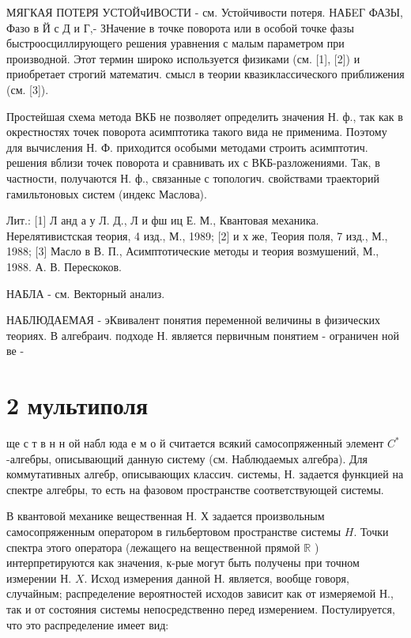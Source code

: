 \documentclass[10pt]{article}
\begin{document}
МЯГКАЯ ПОТЕРЯ УСТОЙчИВОСТИ - см. Устойчивости потеря. НАБEГ ФАЗЫ, Фазо в Й с Д и Г,- ЗНачение в точке поворота или в особой точке фазы быстроосциллирующего решения уравнения с малым параметром при производной. Этот термин широко используется физиками (см. [1], [2]) и приобретает строгий математич. смысл в теории квазиклассического приближения (см. [3]).



Простейшая схема метода ВКБ не позволяет определить значения Н. ф., так как в окрестностях точек поворота асимптотика такого вида не применима. Поэтому для вычисления Н. Ф. приходится особыми методами строить асимптотич. решения вблизи точек поворота и сравнивать их с ВКБ-разложениями. Так, в частности, получаются Н. ф., связанные с топологич. свойствами траекторий гамильтоновых систем (индекс Маслова).



Лит.: [1] Л анд а у Л. Д., Л и фш иц Е. М., Квантовая механика. Нерелятивистская теория, 4 изд., М., 1989; [2] и х же, Теория поля, 7 изд., М., 1988; [3] Масло в В. П., Асимптотические методы и теория возмушений, М., 1988. А. В. Перескоков.



НАБЛА - см. Векторный анализ.



НАБЛЮДАЕМАЯ - эКвивалент понятия переменной величины в физических теориях. В алгебраич. подходе Н. является первичным понятием - ограничен ной ве -



\section{2 мультиполя}

ще с т в н н ой набл юда е м о й считается всякий самосопряженный элемент $C^{*}$-алгебры, описывающий данную систему (см. Наблюдаемых алгебра). Для коммутативных алгебр, описывающих классич. системы, Н. задается функцией на спектре алгебры, то есть на фазовом пространстве соответствующей системы.



В квантовой механике вещественная Н. Х задается произвольным самосопряженным оператором в гильбертовом пространстве системы $H$. Точки спектра этого оператора (лежащего на вещественной прямой $\mathbb{R}$ ) интерпретируются как значения, к-рые могут быть получены при точном измерении Н. $X$. Исход измерения данной Н. является, вообще говоря, случайным; распределение вероятностей исходов зависит как от измеряемой Н., так и от состояния системы непосредственно перед измерением. Постулируется, что это распределение имеет вид:
\end{document}
